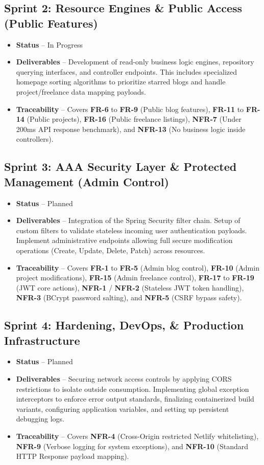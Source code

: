 \documentclass[11pt,a4paper]{article}
\newcommand{\entry}[2]{\item \textbf{#1} -- #2}
\begin{document}
	\subsection{Sprint 2: Resource Engines \& Public Access (Public Features)}
	\begin{itemize}
		\entry{Status}{In Progress}
		\entry{Deliverables}{
			Development of read-only business logic engines, repository querying interfaces, and controller endpoints. This includes specialized homepage sorting algorithms to prioritize starred blogs and handle project/freelance data mapping payloads.
		}
		\entry{Traceability}{
			Covers \textbf{FR-6} to \textbf{FR-9} (Public blog features), \textbf{FR-11} to \textbf{FR-14} (Public projects), \textbf{FR-16} (Public freelance listings), \textbf{NFR-7} (Under 200ms API response benchmark), and \textbf{NFR-13} (No business logic inside controllers).
		}
	\end{itemize}
	
	\subsection{Sprint 3: AAA Security Layer \& Protected Management (Admin Control)}
	\begin{itemize}
		\entry{Status}{Planned}
		\entry{Deliverables}{
			Integration of the Spring Security filter chain. Setup of custom filters to validate stateless incoming user authentication payloads. Implement administrative endpoints allowing full secure modification operations (Create, Update, Delete, Patch) across resources.
		}
		\entry{Traceability}{
			Covers \textbf{FR-1} to \textbf{FR-5} (Admin blog control), \textbf{FR-10} (Admin project modifications), \textbf{FR-15} (Admin freelance control), \textbf{FR-17} to \textbf{FR-19} (JWT core actions), \textbf{NFR-1} / \textbf{NFR-2} (Stateless JWT token handling), \textbf{NFR-3} (BCrypt password salting), and \textbf{NFR-5} (CSRF bypass safety).
		}
	\end{itemize}
	
	\subsection{Sprint 4: Hardening, DevOps, \& Production Infrastructure}
	\begin{itemize}
		\entry{Status}{Planned}
		\entry{Deliverables}{
			Securing network access controls by applying CORS restrictions to isolate outside consumption. Implementing global exception interceptors to enforce error output standards, finalizing containerized build variants, configuring application variables, and setting up persistent debugging logs.
		}
		\entry{Traceability}{
			Covers \textbf{NFR-4} (Cross-Origin restricted Netlify whitelisting), \textbf{NFR-9} (Verbose logging for system exceptions), and \textbf{NFR-10} (Standard HTTP Response payload mapping).
		}
	\end{itemize}
	
\end{document}
